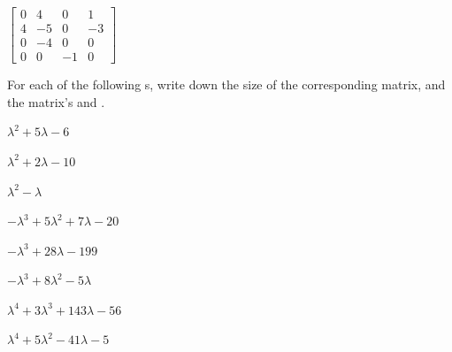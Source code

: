 \begin{exercise}
\begin{parts}
\item \(\begin{bmatrix} 0 & 4 & 0 & 1
\\4 & -5 & 0 & -3
\\0 & -4 & 0 & 0
\\0 & 0 & -1 & 0 \end{bmatrix}\)

\end{parts}
\end{exercise}








\begin{exercise} \label{ex:} 
For each of the following s, write down the size of the corresponding matrix, and the matrix's  and .
\begin{parts}
\item \(\lambda^2+5\lambda-6\)

\item \(\lambda^2+2\lambda-10\)

\item \(\lambda^2-\lambda\)

\item \(-\lambda^3+5\lambda^2+7\lambda-20\)

\item \(-\lambda^3+28\lambda-199\)

\item \(-\lambda^3+8\lambda^2-5\lambda\)

\item \(\lambda^4+3\lambda^3+143\lambda-56\)

\item \(\lambda^4+5\lambda^2-41\lambda-5\)

\end{parts}
\end{exercise}




